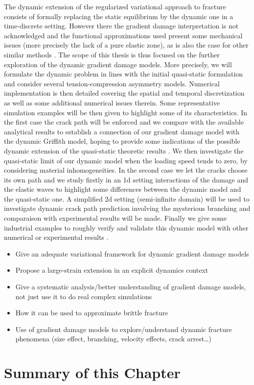 The dynamic extension \cite{Bourdin:2011} of the regularized variational approach to fracture consists of formally replacing the static equilibrium by the dynamic one in a time-discrete setting. However there the gradient damage interpretation is not acknowledged and the functional approximations used present some mechanical issues (more precisely the lack of a pure elastic zone), as is also the case for other similar methods \cite{BordenVerhooselScottHughesLandis:2012,HofackerMiehe:2012,SchlueterWillenbuecherKuhnMueller:2014}. The scope of this thesis is thus focused on the further exploration of the dynamic gradient damage models. More precisely, we will formulate the dynamic problem in lines with the initial quasi-static formulation \cite{PhamMarigo:2010-1} and consider several tension-compression asymmetry models. Numerical implementation is then detailed covering the spatial and temporal discretization as well as some additional numerical issues therein. Some representative simulation examples will be then given to highlight some of its characteristics. In the first case the crack path will be enforced and we compare with the available analytical results to establish a connection of our gradient damage model with the dynamic Griffith model, hoping to provide some indications of the possible dynamic extension of the quasi-static theoretic results \cite{SicsicMarigo:2013}. We then investigate the quasi-static limit of our dynamic model when the loading speed tends to zero, by considering material inhomogeneities. In the second case we let the cracks choose its own path and we study firstly in an 1d setting interactions of the damage and the elastic waves to highlight some differences between the dynamic model and the quasi-static one. A simplified 2d setting (semi-infinite domain) will be used to investigate dynamic crack path prediction involving the mysterious branching and comparaison with experimental results \cite{Ravi-ChandarKnauss:1984a,Ravi-ChandarKnauss:1984b} will be made. Finally we give some industrial examples to roughly verify and validate this dynamic model with other numerical or experimental results \cite{SongWangBelytschko:2008}.

\begin{itemize}
\item Give an adequate variational framework for dynamic gradient damage models
\item Propose a large-strain extension in an explicit dynamics  context
\item Give a systematic analysis/better understanding of gradient damage models, not just use it to do real complex simulations
\item How it can be used to approximate brittle fracture
\item Use of gradient damage models to explore/understand dynamic fracture phenomena (size effect, branching, velocity effects, crack arrest\ldots)
\end{itemize}

\section*{Summary of this Chapter} \label{sec:summarychap1}

